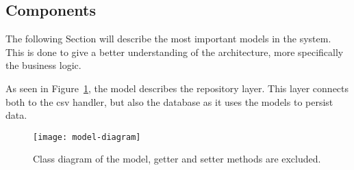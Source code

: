 \subsection{Components}\label{subsec:components}
The following Section will describe the most important models in the system.
This is done to give a better understanding of the architecture, more specifically the business logic.

As seen in Figure~\ref{fig:model-diagram}, the model describes the repository layer.
This layer connects both to the csv handler, but also the database as it uses the models to persist data.

\begin{figure}[H]
    \centering
    \texttt{[image: model-diagram]}
    \caption{Class diagram of the model, getter and setter methods are excluded.
    }\label{fig:model-diagram}
\end{figure}

